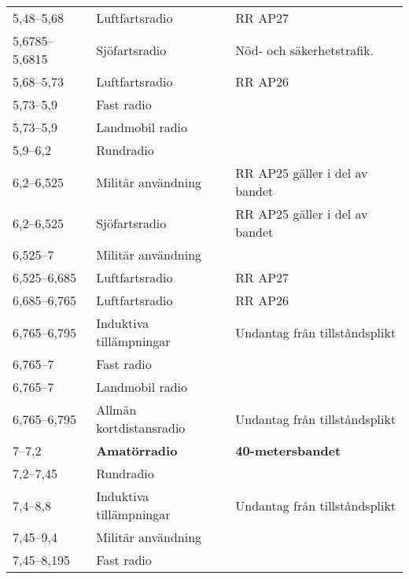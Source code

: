 \begin{landscape}
\begin{longtable}{lll}
5,48--5,68        & Luftfartsradio                   & RR AP27                         \\
5,6785--5,6815    & Sjöfartsradio                    & Nöd- och säkerhetstrafik.       \\
5,68--5,73        & Luftfartsradio                   & RR AP26                         \\
5,73--5,9         & Fast radio                       &                                 \\
5,73--5,9         & Landmobil radio                  &                                 \\
5,9--6,2          & Rundradio                        &                                 \\
6,2--6,525        & Militär användning               & RR AP25 gäller i del av bandet  \\
6,2--6,525        & Sjöfartsradio                    & RR AP25 gäller i del av bandet  \\
6,525--7          & Militär användning               &                                 \\
6,525--6,685      & Luftfartsradio                   & RR AP27                         \\
6,685--6,765      & Luftfartsradio                   & RR AP26                         \\
6,765--6,795      & Induktiva tillämpningar          & Undantag från tillståndsplikt   \\
6,765--7          & Fast radio                       &                                 \\
6,765--7          & Landmobil radio                  &                                 \\
6,765--6,795      & Allmän kortdistansradio          & Undantag från tillståndsplikt   \\
7--7,2            & \textbf{Amatörradio}             & \textbf{40-metersbandet}        \\
7,2--7,45         & Rundradio                        &                                 \\
7,4--8,8          & Induktiva tillämpningar          & Undantag från tillståndsplikt   \\
7,45--9,4         & Militär användning               &                                 \\
7,45--8,195       & Fast radio                       &                                 \\

\end{longtable}
\end{landscape}

